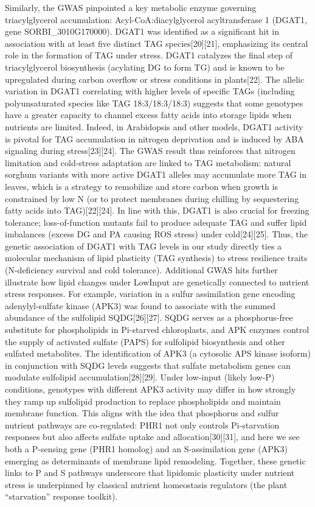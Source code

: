 \documentclass[10pt,letterpaper]{article}
\begin{document}
Similarly, the GWAS pinpointed a key metabolic enzyme governing triacylglycerol accumulation: Acyl-CoA:diacylglycerol acyltransferase 1 (DGAT1, gene SORBI\_3010G170000). DGAT1 was identified as a significant hit in association with at least five distinct TAG species[20][21], emphasizing its central role in the formation of TAG under stress. DGAT1 catalyzes the final step of triacylglycerol biosynthesis (acylating DG to form TG) and is known to be upregulated during carbon overflow or stress conditions in plants[22]. The allelic variation in DGAT1 correlating with higher levels of specific TAGs (including polyunsaturated species like TAG 18:3/18:3/18:3) suggests that some genotypes have a greater capacity to channel excess fatty acids into storage lipids when nutrients are limited. Indeed, in Arabidopsis and other models, DGAT1 activity is pivotal for TAG accumulation in nitrogen deprivation and is induced by ABA signaling during stress[23][24]. The GWAS result thus reinforces that nitrogen limitation and cold-stress adaptation are linked to TAG metabolism: natural sorghum variants with more active DGAT1 alleles may accumulate more TAG in leaves, which is a strategy to remobilize and store carbon when growth is constrained by low N (or to protect membranes during chilling by sequestering fatty acids into TAG)[22][24]. In line with this, DGAT1 is also crucial for freezing tolerance; loss-of-function mutants fail to produce adequate TAG and suffer lipid imbalances (excess DG and PA causing ROS stress) under cold[24][25]. Thus, the genetic association of DGAT1 with TAG levels in our study directly ties a molecular mechanism of lipid plasticity (TAG synthesis) to stress resilience traits (N-deficiency survival and cold tolerance).
Additional GWAS hits further illustrate how lipid changes under LowInput are genetically connected to nutrient stress responses. For example, variation in a sulfur assimilation gene encoding adenylyl-sulfate kinase (APK3) was found to associate with the summed abundance of the sulfolipid SQDG[26][27]. SQDG serves as a phosphorus-free substitute for phospholipids in Pi-starved chloroplasts, and APK enzymes control the supply of activated sulfate (PAPS) for sulfolipid biosynthesis and other sulfated metabolites. The identification of APK3 (a cytosolic APS kinase isoform) in conjunction with SQDG levels suggests that sulfate metabolism genes can modulate sulfolipid accumulation[28][29]. Under low-input (likely low-P) conditions, genotypes with different APK3 activity may differ in how strongly they ramp up sulfolipid production to replace phospholipids and maintain membrane function. This aligns with the idea that phosphorus and sulfur nutrient pathways are co-regulated: PHR1 not only controls Pi-starvation responses but also affects sulfate uptake and allocation[30][31], and here we see both a P-sensing gene (PHR1 homolog) and an S-assimilation gene (APK3) emerging as determinants of membrane lipid remodeling. Together, these genetic links to P and S pathways underscore that lipidomic plasticity under nutrient stress is underpinned by classical nutrient homeostasis regulators (the plant “starvation” response toolkit).
\end{document}
